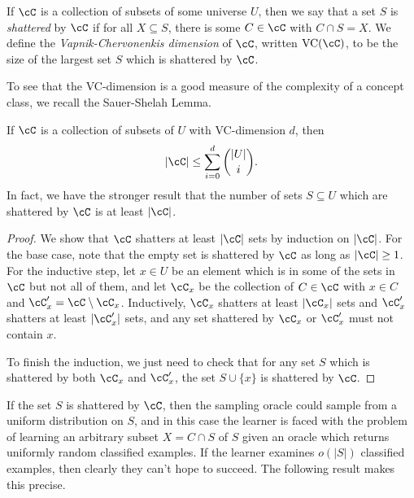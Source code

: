 \begin{defn} If $\cC$ is a collection of subsets of some universe $U$, then we say that a set $S$ is \emph{shattered} by $\cC$ if for all $X \subseteq S$, there is some $C \in \cC$ with $C \cap S = X$. We define the \emph{Vapnik-Chervonenkis dimension} of $\cC$, written $\operatorname{VC}(\cC)$, to be the size of the largest set $S$ which is shattered by $\cC$.
\end{defn}

To see that the VC-dimension is a good measure of the complexity of a concept class, we recall the Sauer-Shelah Lemma.

\begin{lem}\label{sauer-shelah} If $\cC$ is a collection of subsets of $U$ with VC-dimension $d$, then
\[
|\cC| \le \sum_{i = 0}^d \binom{|U|}{i}.
\]
In fact, we have the stronger result that the number of sets $S \subseteq U$ which are shattered by $\cC$ is at least $|\cC|$.
\end{lem}
\begin{proof} We show that $\cC$ shatters at least $|\cC|$ sets by induction on $|\cC|$. For the base case, note that the empty set is shattered by $\cC$ as long as $|\cC| \ge 1$. For the inductive step, let $x \in U$ be an element which is in some of the sets in $\cC$ but not all of them, and let $\cC_x$ be the collection of $C \in \cC$ with $x \in C$ and $\cC_x' = \cC \setminus \cC_x$. Inductively, $\cC_x$ shatters at least $|\cC_x|$ sets and $\cC_x'$ shatters at least $|\cC_x'|$ sets, and any set shattered by $\cC_x$ or $\cC_x'$ must not contain $x$.

To finish the induction, we just need to check that for any set $S$ which is shattered by both $\cC_x$ and $\cC_x'$, the set $S\cup \{x\}$ is shattered by $\cC$.
\end{proof}

If the set $S$ is shattered by $\cC$, then the sampling oracle could sample from a uniform distribution on $S$, and in this case the learner is faced with the problem of learning an arbitrary subset $X = C \cap S$ of $S$ given an oracle which returns uniformly random classified examples. If the learner examines $o(|S|)$ classified examples, then clearly they can't hope to succeed. The following result makes this precise.

